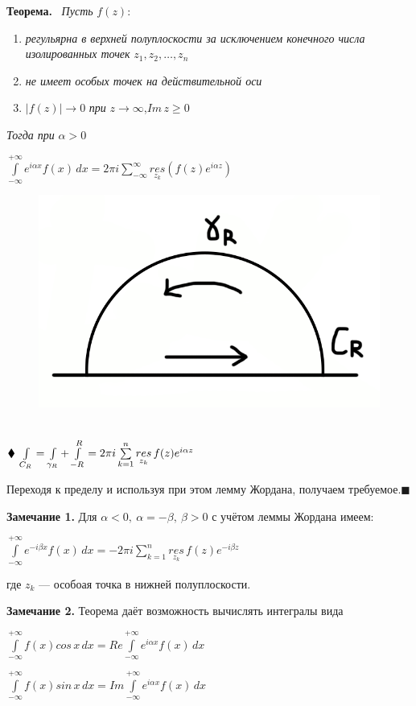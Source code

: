 \documentclass[a4paper, 12pt]{report}
\begin{document}
\textbf{Теорема.} \ \textit{Пусть} $f(z)$:
\begin{enumerate} 
\item \textit{регульярна в верхней полуплоскости за исключением конечного числа изолированных точек} $z_1, z_2, \dots, z_n$
\item \textit{не имеет особых точек на действительной оси}
\item $|f(z)| \rightarrow 0$ \textit{при} $z \rightarrow \infty$,\quad $Im\,z \ge 0$
\end{enumerate}
\par \textit{Тогда при} $\alpha > 0$
\begin{center}
    $\int\limits_{-\infty}^{+\infty}e^{i\alpha x} f(x)\, dx = 2\pi i \sum\limits_{-\infty}^{\infty} \overset{}{\underset{z_k}{res}} (f(z) e^{i\alpha z})$
\end{center} 
\begin{figure} 
    \vspace{-10ex}
    \includegraphics{jordan/2_2.png}
\end{figure}
\\
$\blacklozenge \hspace{1 mm} \int\limits_{C_R} = \int\limits_{\gamma_R} + \int\limits_{-R}^{R} = 2\pi i \sum\limits_{k=1}^{n} \overset{}{\underset{z_k}{res}}\,f(z) e^{i\alpha z}$ 
\par\bigskip Переходя к пределу и используя при этом лемму Жордана, получаем требуемое.$\blacksquare$
\par\bigskip
\textbf{Замечание 1.} \quad Для $\alpha < 0,\ \alpha = -\beta,\ \beta > 0$ с учётом леммы Жордана имеем:
\begin{center}
    $\int\limits_{-\infty}^{+\infty}e^{-i\beta x} f(x)\, dx = -2\pi i \sum\limits_{k=1}^{n} \overset{}{\underset{z_k}{res}}\,f(z) e^{-i\beta z}$
\end{center}
\par где $z_k$ --- особоая точка в нижней полуплоскости.
\par\bigskip
\textbf{Замечание 2.} \quad Теорема даёт возможность вычислять интегралы вида
\begin{center}
    $\int\limits_{-\infty}^{+\infty} f(x) cos\,x\, dx = Re\int\limits_{-\infty}^{+\infty}e^{i\alpha x} f(x)\, dx$
    \par
    $\int\limits_{-\infty}^{+\infty} f(x) sin\,x\, dx = Im\int\limits_{-\infty}^{+\infty}e^{i\alpha x} f(x)\, dx$
\end{center}
\end{document}
